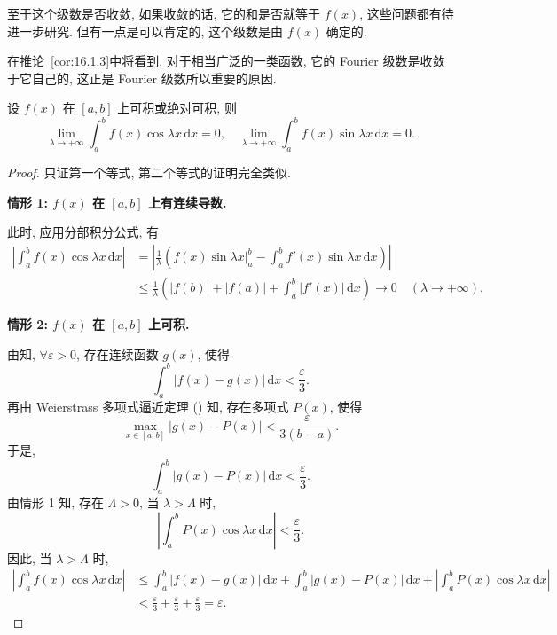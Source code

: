 至于这个级数是否收敛, 如果收敛的话, 它的和是否就等于 $f(x)$, 这些问题都有待进一步研究. 但有一点是可以肯定的, 这个级数是由 $f(x)$ 确定的.

在推论~\ref{cor:16.1.3}中将看到, 对于相当广泛的一类函数, 它的 Fourier 级数是收敛于它自己的, 这正是 Fourier 级数所以重要的原因.

\begin{theorem}\label{thm:16.1.2}
设 $f(x)$ 在 $[a,b]$ 上可积或绝对可积, 则
\[
  \lim_{\lambda\to+\infty}\int_{a}^{b}f(x)\cos\lambda x\,\mathrm{d}x=0,\quad \lim_{\lambda\to+\infty}\int_{a}^{b}f(x)\sin\lambda x\,\mathrm{d}x=0.
\]
\end{theorem}

\begin{proof}
只证第一个等式, 第二个等式的证明完全类似.

\textbf{情形 1: $f(x)$ 在 $[a,b]$ 上有连续导数.}

此时, 应用分部积分公式, 有
\[
  \begin{aligned}
    \left|\int_{a}^{b}f(x)\cos\lambda x\,\mathrm{d}x\right|&=\left|\frac{1}{\lambda}\left(\left.f(x)\sin\lambda x\right|_{a}^{b}-\int_{a}^{b}f'(x)\sin\lambda x\,\mathrm{d}x\right)\right|\\
    &\leqslant\frac{1}{\lambda}\left(|f(b)|+|f(a)|+\int_{a}^{b}|f'(x)|\,\mathrm{d}x\right)\to 0\quad(\lambda\to+\infty).
  \end{aligned}
\]

\textbf{情形 2: $f(x)$ 在 $[a,b]$ 上可积.}

由知, $\forall\varepsilon>0$, 存在连续函数 $g(x)$, 使得
\[
  \int_{a}^{b}|f(x)-g(x)|\,\mathrm{d}x<\frac{\varepsilon}{3}.
\]
再由 Weierstrass 多项式逼近定理 () 知, 存在多项式 $P(x)$, 使得
\[
  \max_{x\in[a,b]}|g(x)-P(x)|<\frac{\varepsilon}{3(b-a)}.
\]
于是,
\[
  \int_{a}^{b}|g(x)-P(x)|\,\mathrm{d}x<\frac{\varepsilon}{3}.
\]
由情形 1 知, 存在 $\Lambda>0$, 当 $\lambda>\Lambda$ 时,
\[
  \left|\int_{a}^{b}P(x)\cos\lambda x\,\mathrm{d}x\right|<\frac{\varepsilon}{3}.
\]
因此, 当 $\lambda>\Lambda$ 时,
\[
  \begin{aligned}
    \left|\int_{a}^{b}f(x)\cos\lambda x\,\mathrm{d}x\right|&\leqslant\int_{a}^{b}|f(x)-g(x)|\,\mathrm{d}x+\int_{a}^{b}|g(x)-P(x)|\,\mathrm{d}x+\left|\int_{a}^{b}P(x)\cos\lambda x\,\mathrm{d}x\right|\\
    &<\frac{\varepsilon}{3}+\frac{\varepsilon}{3}+\frac{\varepsilon}{3}=\varepsilon.
  \end{aligned}
\]


\end{proof}
